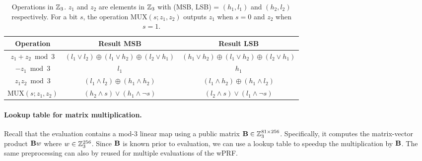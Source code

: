 \begin{table}[ht]
\begin{center}
    \begin{tabular}{|c|c|c|}
        \hline
        \textbf{Operation} & \textbf{Result MSB} &\textbf{Result LSB}\\
        \hline\hline
        $z_1 + z_2 \bmod 3$ & $(l_1 \vee l_2) \oplus (l_1 \vee h_2) \oplus (l_2 \vee h_1)$  & $(h_1 \vee h_2) \oplus (l_1 \vee h_2) \oplus (l_2 \vee h_1)$\\
        $-z_1 \bmod 3$ & $l_1$ & $h_1$ \\
        $z_1z_2 \bmod 3$ & $(l_1 \wedge l_2) \oplus (h_1 \wedge h_2)$ & $(l_1 \wedge h_2) \oplus (h_1 \wedge l_2)$\\
        $\textrm{MUX}(s;z_1,z_2)$ & $(h_2 \wedge s) \vee (h_1 \wedge \neg s)$ & $(l_2 \wedge s) \vee (l_1 \wedge \neg s)$\\
        \hline
    \end{tabular}
\end{center}
\caption{Operations in $\mathbb{Z}_3$. $z_1$ and $z_2$ are elements in $\mathbb{Z}_3$ with (MSB, LSB) = $(h_1,l_1)$ and $(h_2, l_2)$ respectively. For a bit $s$, the operation $\textrm{MUX}(s;z_1, z_2)$ outputs $z_1$ when $s=0$ and $z_2$ when $s=1$.}
\label{table:z3_operations}
\end{table}


\paragraph{Lookup table for matrix multiplication.} Recall that the \ttwPRF evaluation contains a mod-3 linear map using a public matrix $\mat{B} \in \Z_3^{81\times256}$. Specifically, it computes the matrix-vector product $\mat{B}w$ where $w \in \mathbb{Z}_3^{256}$. Since $\mat{B}$ is known prior to evaluation, we can use a lookup table to speedup the multiplication by $\mat{B}$. The same preprocessing can also by reused for multiple evaluations of the wPRF.


